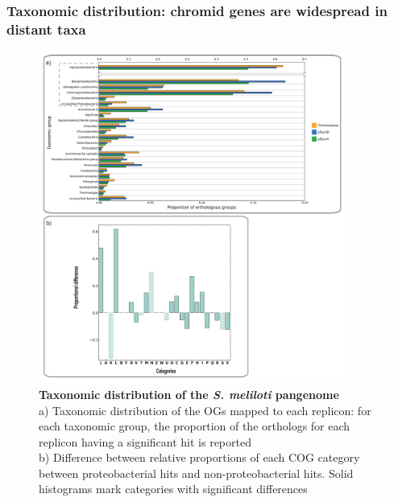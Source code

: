 \subsubsection{Taxonomic distribution: chromid genes are widespread in distant taxa}
\begin{figure}[!t]
	\center
    \includegraphics[width=0.9\textwidth]{figures/4/thesis_31}
	\caption{\label{fig:taxa}\textbf{Taxonomic distribution of the \textit{S. meliloti} pangenome}\\
	a) Taxonomic distribution of the OGs mapped to each replicon: for each taxonomic group, the proportion of the orthologs for each replicon having a significant hit is reported\\
	b) Difference between relative proportions of each COG category between proteobacterial hits and non-proteobacterial hits. Solid histograms mark categories with significant differences}
\end{figure}

